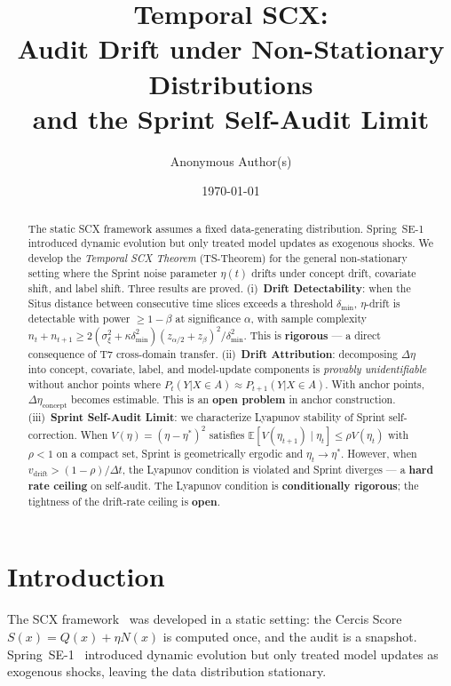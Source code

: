 \documentclass[12pt,a4paper]{article}
\title{\bfseries Temporal SCX:\\
Audit Drift under Non-Stationary Distributions\\
and the Sprint Self-Audit Limit}
\author{Anonymous Author(s)}
\date{\today}
\newcommand{\E}{\mathbb{E}}
\begin{document}
\maketitle

\begin{abstract}
The static SCX framework assumes a fixed data-generating distribution.
Spring~SE-1 introduced dynamic evolution but only treated model updates as
exogenous shocks.  We develop the \emph{Temporal SCX Theorem} (TS-Theorem)
for the general non-stationary setting where the Sprint noise parameter
$\eta(t)$ drifts under concept drift, covariate shift, and label shift.
Three results are proved.  (i)~\textbf{Drift Detectability}: when the Situs
distance between consecutive time slices exceeds a threshold $\delta_{\min}$,
$\eta$-drift is detectable with power $\geq 1-\beta$ at significance
$\alpha$, with sample complexity
$n_t + n_{t+1} \geq 2(\sigma^2_\xi + \kappa\delta^2_{\min})
(z_{\alpha/2} + z_\beta)^2 / \delta^2_{\min}$.  This is \textbf{rigorous}
— a direct consequence of T7 cross-domain transfer.  (ii)~\textbf{Drift
Attribution}: decomposing $\Delta\eta$ into concept, covariate, label, and
model-update components is \emph{provably unidentifiable} without anchor
points where $P_t(Y|X \in A) \approx P_{t+1}(Y|X \in A)$.  With anchor
points, $\Delta\eta_{\mathrm{concept}}$ becomes estimable.  This is an
\textbf{open problem} in anchor construction.  (iii)~\textbf{Sprint
Self-Audit Limit}: we characterize Lyapunov stability of Sprint
self-correction.  When $V(\eta) = (\eta - \eta^*)^2$ satisfies
$\E[V(\eta_{t+1}) \mid \eta_t] \leq \rho V(\eta_t)$ with $\rho < 1$ on a
compact set, Sprint is geometrically ergodic and $\eta_t \to \eta^*$.
However, when $v_{\mathrm{drift}} > (1-\rho)/\Delta t$, the Lyapunov
condition is violated and Sprint diverges — a \textbf{hard rate ceiling}
on self-audit.  The Lyapunov condition is \textbf{conditionally rigorous};
the tightness of the drift-rate ceiling is \textbf{open}.
\end{abstract}

\section{Introduction}

The SCX framework~\citep{scx2024cercis} was developed in a static setting:
the Cercis Score $S(x) = Q(x) + \eta N(x)$ is computed once, and the audit
is a snapshot.  Spring~SE-1~\citep{scx2024spring} introduced dynamic
evolution but only treated model updates as exogenous shocks, leaving the
data distribution stationary.
\end{document}
